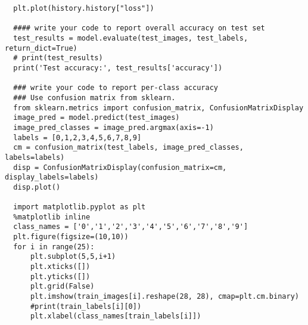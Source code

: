\begin{lstlisting}
  plt.plot(history.history["loss"])

  #### write your code to report overall accuracy on test set
  test_results = model.evaluate(test_images, test_labels, return_dict=True)
  # print(test_results)
  print('Test accuracy:', test_results['accuracy'])

  ### write your code to report per-class accuracy
  ### Use confusion matrix from sklearn. 
  from sklearn.metrics import confusion_matrix, ConfusionMatrixDisplay
  image_pred = model.predict(test_images)
  image_pred_classes = image_pred.argmax(axis=-1)
  labels = [0,1,2,3,4,5,6,7,8,9]
  cm = confusion_matrix(test_labels, image_pred_classes, labels=labels)
  disp = ConfusionMatrixDisplay(confusion_matrix=cm, display_labels=labels)
  disp.plot()

  import matplotlib.pyplot as plt
  %matplotlib inline
  class_names = ['0','1','2','3','4','5','6','7','8','9']
  plt.figure(figsize=(10,10))
  for i in range(25):
      plt.subplot(5,5,i+1)
      plt.xticks([])
      plt.yticks([])
      plt.grid(False)
      plt.imshow(train_images[i].reshape(28, 28), cmap=plt.cm.binary)
      #print(train_labels[i][0])
      plt.xlabel(class_names[train_labels[i]])
\end{lstlisting}